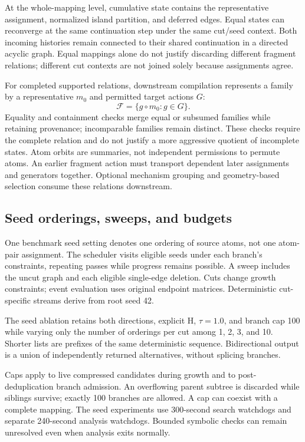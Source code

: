 At the whole-mapping level, cumulative state contains the representative assignment, normalized island partition, and deferred edges. Equal states can reconverge at the same continuation step under the same cut/seed context. Both incoming histories remain connected to their shared continuation in a directed acyclic graph. Equal mappings alone do not justify discarding different fragment relations; different cut contexts are not joined solely because assignments agree.

For completed supported relations, downstream compilation represents a family by a representative $m_0$ and permitted target actions $G$:
\begin{equation}
\mathcal F=\{g\circ m_0:g\in G\}.
\end{equation}
Equality and containment checks merge equal or subsumed families while retaining provenance; incomparable families remain distinct. These checks require the complete relation and do not justify a more aggressive quotient of incomplete states. Atom orbits are summaries, not independent permissions to permute atoms. An earlier fragment action must transport dependent later assignments and generators together. Optional mechanism grouping and geometry-based selection consume these relations downstream.

\subsection{Seed orderings, sweeps, and budgets}

One benchmark seed setting denotes one ordering of source atoms, not one atom-pair assignment. The scheduler visits eligible seeds under each branch's constraints, repeating passes while progress remains possible. A sweep includes the uncut graph and each eligible single-edge deletion. Cuts change growth constraints; event evaluation uses original endpoint matrices. Deterministic cut-specific streams derive from root seed 42.

The seed ablation retains both directions, explicit H, $\tau=1.0$, and branch cap 100 while varying only the number of orderings per cut among 1, 2, 3, and 10. Shorter lists are prefixes of the same deterministic sequence. Bidirectional output is a union of independently returned alternatives, without splicing branches.

Caps apply to live compressed candidates during growth and to post-deduplication branch admission. An overflowing parent subtree is discarded while siblings survive; exactly 100 branches are allowed. A cap can coexist with a complete mapping. The seed experiments use 300-second search watchdogs and separate 240-second analysis watchdogs. Bounded symbolic checks can remain unresolved even when analysis exits normally.

